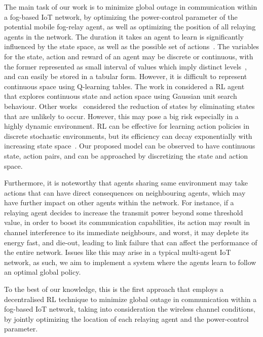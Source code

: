 \documentclass[journal]{IEEEtran}
\begin{document}
The main task of our work is to minimize global outage in communication within a fog-based IoT network, by optimizing the power-control parameter of the potential mobile fog-relay agent, as well as optimizing the position of all relaying agents in the network. The duration it takes an agent to learn is significantly influenced by the state space, as well as the possible set of actions~\cite{Dusparic2009}. The variables for the state, action and reward of an agent may be discrete or continuous, with the former represented as small interval of values which imply distinct levels~\cite{Yau2012}, and can easily be stored in a tabular form. However, it is difficult to represent continuous space using Q-learning tables. The work in \cite{Vucevic2007} considered a RL agent that explores continuous state and action space using Gaussian unit search behaviour. Other works~\cite{Dusparic2009, Cuayahuitl2006} considered the reduction of states by eliminating states that are unlikely to occur. However, this may pose a big risk especially in a highly dynamic environment. RL can be effective for learning action policies in discrete stochastic environments, but its efficiency can decay exponentially with increasing state space~\cite{Uther1998}. Our proposed model can be observed to have continuous state, action pairs, and can be approached by discretizing the state and action space.

Furthermore, it is noteworthy that agents sharing same environment may take actions that can have direct consequences on neighbouring agents, which may have further impact on other agents within the network. For instance, if a relaying agent decides to increase the transmit power beyond some threshold value, in order to boost its communication capabilities, its action may result in channel interference to its immediate neighbours, and worst, it may deplete its energy fast, and die-out, leading to link failure that can affect the performance of the entire network. Issues like this may arise in a typical multi-agent IoT network, as such, we aim to implement a system where the agents learn to follow an optimal global policy.

To the best of our knowledge, this is the first approach that employs a decentralised RL technique to minimize global outage in communication within a fog-based IoT network, taking into consideration the wireless channel conditions, by jointly optimizing the location of each relaying agent and the power-control parameter.
\end{document}
